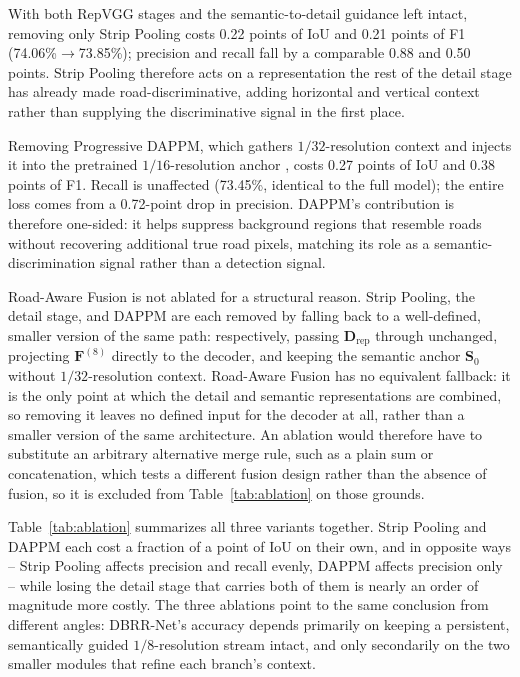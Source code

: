 \documentclass[a4paper,fleqn, review]{cas-sc}
\begin{document}
With both RepVGG stages and the semantic-to-detail guidance left intact,
removing only Strip Pooling costs 0.22 points of IoU and 0.21 points of F1
(74.06\%$\rightarrow$73.85\%); precision and recall fall by a comparable
0.88 and 0.50 points. Strip Pooling therefore acts on a representation the
rest of the detail stage has already made road-discriminative, adding
horizontal and vertical context rather than supplying the discriminative
signal in the first place.

Removing Progressive DAPPM, which gathers $1/32$-resolution context and
injects it into the pretrained $1/16$-resolution anchor
, costs
0.27 points of IoU and 0.38 points of F1. Recall is unaffected
(73.45\%, identical to the full model); the entire loss comes from a
0.72-point drop in precision. DAPPM's contribution is therefore one-sided:
it helps suppress background regions that resemble roads without recovering
additional true road pixels, matching its role as a semantic-discrimination
signal rather than a detection signal.

Road-Aware Fusion is not ablated for a structural reason. Strip Pooling,
the detail stage, and DAPPM are each removed by falling back to a
well-defined, smaller version of the same path: respectively, passing
$\mathbf{D}_{\mathrm{rep}}$ through unchanged, projecting $\mathbf{F}^{(8)}$
directly to the decoder, and keeping the semantic anchor $\mathbf{S}_0$
without $1/32$-resolution context. Road-Aware Fusion has no equivalent fallback:
it is the only point at which the detail and semantic representations are
combined, so removing it leaves no defined
input for the decoder at all, rather than a smaller version of the same
architecture. An ablation would therefore have to substitute an arbitrary
alternative merge rule, such as a plain sum or concatenation, which tests a
different fusion design rather than the absence of fusion, so it is
excluded from Table~\ref{tab:ablation} on those grounds.

Table~\ref{tab:ablation} summarizes all three variants together. Strip
Pooling and DAPPM each cost a fraction of a point of IoU on their own, and
in opposite ways -- Strip Pooling affects precision and recall evenly,
DAPPM affects precision only -- while losing the detail stage that carries
both of them is nearly an order of magnitude more costly. The three
ablations point to the same conclusion from different angles: DBRR-Net's
accuracy depends primarily on keeping a persistent, semantically guided
$1/8$-resolution stream intact, and only secondarily on the two smaller modules
that refine each branch's context.
\end{document}
